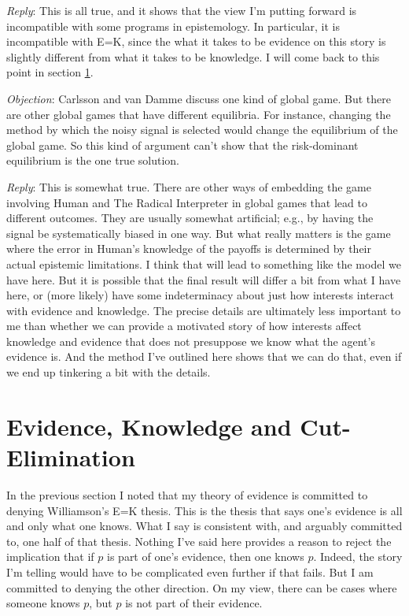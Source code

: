 \documentclass[11pt,]{book}
\begin{document}
\emph{Reply}: This is all true, and it shows that the view I'm putting forward is incompatible with some programs in epistemology. In particular, it is incompatible with E=K, since the what it takes to be evidence on this story is slightly different from what it takes to be knowledge. I will come back to this point in section \ref{cutelim}.

\emph{Objection}: Carlsson and van Damme discuss one kind of global game. But there are other global games that have different equilibria. For instance, changing the method by which the noisy signal is selected would change the equilibrium of the global game. So this kind of argument can't show that the risk-dominant equilibrium is the one true solution.

\emph{Reply}: This is somewhat true. There are other ways of embedding the game involving Human and The Radical Interpreter in global games that lead to different outcomes. They are usually somewhat artificial; e.g., by having the signal be systematically biased in one way. But what really matters is the game where the error in Human's knowledge of the payoffs is determined by their actual epistemic limitations. I think that will lead to something like the model we have here. But it is possible that the final result will differ a bit from what I have here, or (more likely) have some indeterminacy about just how interests interact with evidence and knowledge. The precise details are ultimately less important to me than whether we can provide a motivated story of how interests affect knowledge and evidence that does not presuppose we know what the agent's evidence is. And the method I've outlined here shows that we can do that, even if we end up tinkering a bit with the details.

\hypertarget{cutelim}{%
\section{Evidence, Knowledge and Cut-Elimination}\label{cutelim}}

In the previous section I noted that my theory of evidence is committed to denying Williamson's E=K thesis. This is the thesis that says one's evidence is all and only what one knows. What I say is consistent with, and arguably committed to, one half of that thesis. Nothing I've said here provides a reason to reject the implication that if \(p\) is part of one's evidence, then one knows \(p\). Indeed, the story I'm telling would have to be complicated even further if that fails. But I am committed to denying the other direction. On my view, there can be cases where someone knows \(p\), but \(p\) is not part of their evidence.
\end{document}
